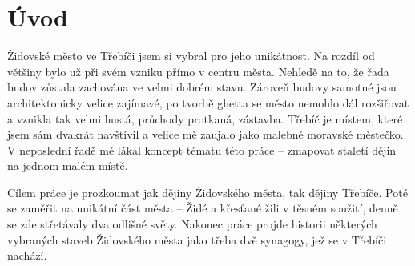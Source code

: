 \chapter*{Úvod}

Židovské město ve Třebíči jsem si vybral pro jeho unikátnost.
Na rozdíl od většiny bylo už při svém vzniku přímo v centru města.
Nehledě na to, že řada budov zůstala zachována ve velmi dobrém stavu.
Zároveň budovy samotné jsou architektonicky velice zajímavé, po tvorbě ghetta se město nemohlo dál rozšiřovat a vznikla tak velmi hustá, průchody protkaná, zástavba.
Třebíč je místem, které jsem sám dvakrát navštívil a velice mě zaujalo jako malebné moravské městečko.
V neposlední řadě mě lákal koncept tématu této práce -- zmapovat staletí dějin na jednom malém místě.

Cílem práce je prozkoumat jak dějiny Židovského města, tak dějiny Třebíče.
Poté se zaměřit na unikátní část města -- Židé a křesťané žili v těsném soužití, denně se zde střetávaly dva odlišné světy.
Nakonec práce projde historii některých vybraných staveb Židovského města jako třeba dvě synagogy, jež se v Třebíči nachází.
